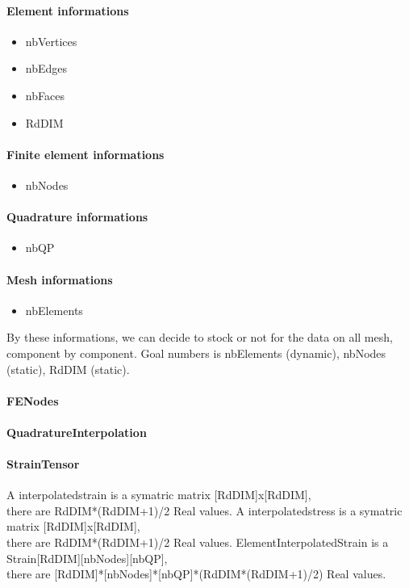 \documentclass[a4paper,10pt]{article}
\begin{document}
\paragraph{Element informations }
\begin{itemize}
\item nbVertices
\item nbEdges
\item nbFaces
\item RdDIM
\end{itemize}
\paragraph{Finite element informations }
\begin{itemize}
\item nbNodes
\end{itemize}
\paragraph{Quadrature informations }
\begin{itemize}
\item nbQP 
\end{itemize}
\paragraph{Mesh informations }
\begin{itemize}
\item nbElements
\end{itemize}
By these informations, we can decide to stock or not for the data on all mesh, component by component. Goal numbers is nbElements (dynamic), nbNodes (static), RdDIM (static).
\paragraph{FENodes }
\paragraph{QuadratureInterpolation }
\paragraph{StrainTensor }
A interpolatedstrain is a symatric matrix [RdDIM]x[RdDIM], \\ there are RdDIM*(RdDIM+1)/2 Real values.
A interpolatedstress is a symatric matrix [RdDIM]x[RdDIM], \\ there are RdDIM*(RdDIM+1)/2 Real values.
ElementInterpolatedStrain is a Strain[RdDIM][nbNodes][nbQP], \\ there are [RdDIM]*[nbNodes]*[nbQP]*(RdDIM*(RdDIM+1)/2) Real values.
\end{document}
